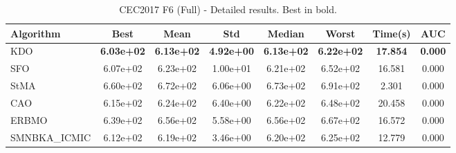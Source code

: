 \begin{table}[H]
\centering\small
\caption{CEC2017 F6 (Full) - Detailed results. Best in bold.}
\label{tab:cec2017_F6}
\begin{tabular}{lccccccc}
\toprule
\textbf{Algorithm} & \textbf{Best} & \textbf{Mean} & \textbf{Std} & \textbf{Median} & \textbf{Worst} & \textbf{Time(s)} & \textbf{AUC} \\
\midrule
KDO & \textbf{6.03e+02} & \textbf{6.13e+02} & \textbf{4.92e+00} & \textbf{6.13e+02} & \textbf{6.22e+02} & \textbf{17.854} & \textbf{0.000} \\
SFO & 6.07e+02 & 6.23e+02 & 1.00e+01 & 6.21e+02 & 6.52e+02 & 16.581 & 0.000 \\
StMA & 6.60e+02 & 6.72e+02 & 6.06e+00 & 6.73e+02 & 6.91e+02 & 2.301 & 0.000 \\
CAO & 6.15e+02 & 6.24e+02 & 6.40e+00 & 6.22e+02 & 6.48e+02 & 20.458 & 0.000 \\
ERBMO & 6.39e+02 & 6.56e+02 & 5.58e+00 & 6.56e+02 & 6.67e+02 & 16.572 & 0.000 \\
SMNBKA_ICMIC & 6.12e+02 & 6.19e+02 & 3.46e+00 & 6.20e+02 & 6.25e+02 & 12.779 & 0.000 \\
\bottomrule
\end{tabular}
\end{table}
